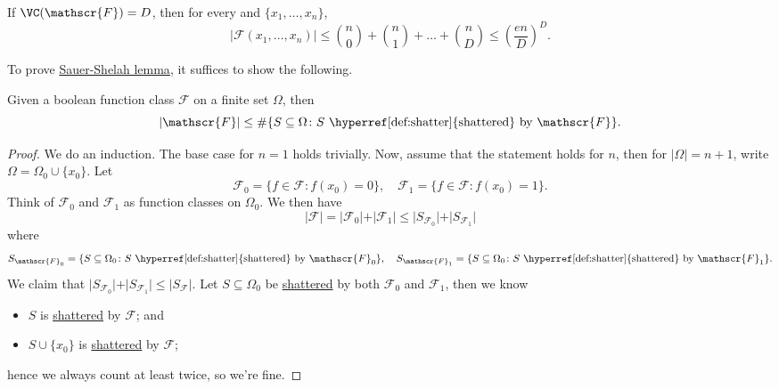 \begin{lemma}\label{lma:Sauer-Shelah}
  If \(\VC(\mathscr{F}) = D\), then for every and \(\{ x_1, \dots , x_n \} \),
  \[
    \vert \mathscr{F} (x_1, \dots , x_n) \vert
    \leq \binom{n}{0} + \binom{n}{1} + \dots + \binom{n}{D}
    \leq \left( \frac{en}{D} \right) ^D.
  \]
\end{lemma}

To prove \hyperref[lma:Sauer-Shelah]{Sauer-Shelah lemma}, it suffices to show the following.

\begin{lemma}\label{lma:Pajor}
  Given a boolean function class \(\mathscr{F} \) on a finite set \(\Omega \), then
  \[
    \vert \mathscr{F} \vert \leq \#\{ S \subseteq \Omega \colon S \text{ \hyperref[def:shatter]{shattered} by } \mathscr{F} \}.
  \]
\end{lemma}
\begin{proof}
  We do an induction. The base case for \(n = 1\) holds trivially. Now, assume that the statement holds for \(n\), then for \(\vert \Omega \vert = n+1\), write \(\Omega = \Omega _0 \cup \{ x_0 \} \). Let
  \[
    \mathscr{F} _0 = \{ f\in \mathscr{F} \colon f(x_0) = 0\} ,\quad
    \mathscr{F} _1 = \{ f\in \mathscr{F} \colon f(x_0) = 1\} .
  \]
  Think of \(\mathscr{F} _0\) and \(\mathscr{F} _1\) as function classes on \(\Omega _0\). We then have
  \[
    \vert \mathscr{F} \vert
    = \vert \mathscr{F} _0 \vert + \vert \mathscr{F} _1 \vert
    \leq \vert S_{\mathscr{F} _0} \vert + \vert S_{\mathscr{F} _1} \vert
  \]
  where
  \[
    S_{\mathscr{F} _0} = \{ S \subseteq \Omega _0 \colon S \text{ \hyperref[def:shatter]{shattered} by } \mathscr{F} _0 \} ,\quad
    S_{\mathscr{F} _1} = \{ S \subseteq \Omega _0 \colon S \text{ \hyperref[def:shatter]{shattered} by } \mathscr{F} _1 \}.
  \]
  We claim that \(\vert S_{\mathscr{F} _0} \vert + \vert S_{\mathscr{F} _1} \vert \leq \vert S _{\mathscr{F} } \vert\). Let \(S \subseteq \Omega _0\) be \hyperref[def:shatter]{shattered} by both \(\mathscr{F} _0\) and \(\mathscr{F} _1\), then we know
  \begin{itemize}
    \item \(S\) is \hyperref[def:shatter]{shattered} by \(\mathscr{F} \); and
    \item \(S \cup \{ x_0 \} \) is \hyperref[def:shatter]{shattered} by \(\mathscr{F} \);
  \end{itemize}
  hence we always count at least twice, so we're fine.
\end{proof}


